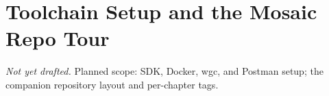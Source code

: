 \chapter{Toolchain Setup and the Mosaic Repo Tour}
\label{app:toolchain}

\emph{Not yet drafted.} Planned scope: SDK, Docker, wgc, and Postman setup; the companion repository layout and per-chapter tags.
